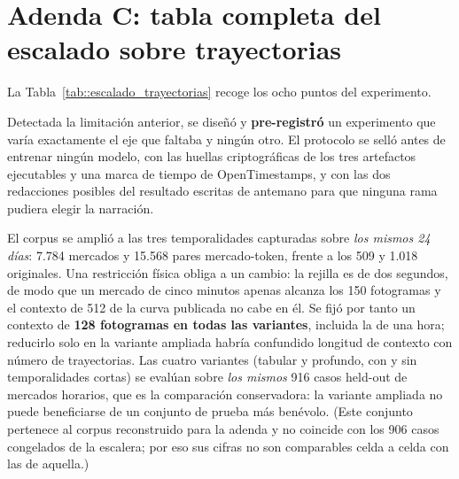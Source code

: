 \section{Adenda C: tabla completa del escalado sobre trayectorias}

La Tabla~\ref{tab::escalado_trayectorias} recoge los ocho puntos del experimento.


Detectada la limitación anterior, se diseñó y \textbf{pre-registró} un experimento que
varía exactamente el eje que faltaba y ningún otro. El protocolo se selló antes de
entrenar ningún modelo, con las huellas criptográficas de los tres artefactos ejecutables
y una marca de tiempo de OpenTimestamps, y con las dos redacciones posibles del resultado
escritas de antemano para que ninguna rama pudiera elegir la narración.

El corpus se amplió a las tres temporalidades capturadas sobre \emph{los mismos 24 días}:
7.784 mercados y 15.568 pares mercado-token, frente a los 509 y 1.018 originales. Una
restricción física obliga a un cambio: la rejilla es de dos segundos, de modo que un
mercado de cinco minutos apenas alcanza los 150 fotogramas y el contexto de 512 de la
curva publicada no cabe en él. Se fijó por tanto un contexto de \textbf{128 fotogramas en
todas las variantes}, incluida la de una hora; reducirlo solo en la variante ampliada habría
confundido longitud de contexto con número de trayectorias. Las cuatro variantes (tabular y
profundo, con y sin temporalidades cortas) se evalúan sobre \emph{los mismos} 916 casos
held-out de mercados horarios, que es la comparación conservadora: la variante ampliada no
puede beneficiarse de un conjunto de prueba más benévolo. (Este conjunto pertenece al
corpus reconstruido para la adenda y no coincide con los 906 casos congelados de la
escalera; por eso sus cifras no son comparables celda a celda con las de aquella.)

